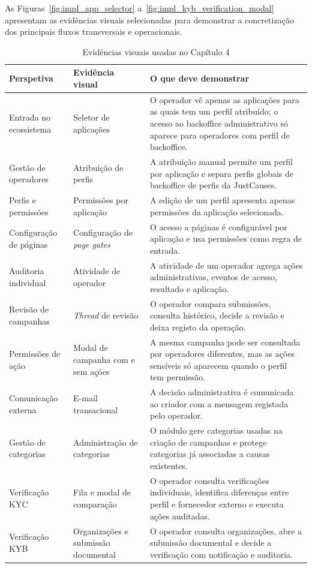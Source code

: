 As Figuras~\ref{fig:impl_app_selector} a~\ref{fig:impl_kyb_verification_modal} apresentam as evidências visuais selecionadas para demonstrar a concretização dos principais fluxos transversais e operacionais.

\begin{table}[H]
\caption{Evidências visuais usadas no Capítulo 4}
\label{tab:evidencias_prints}
\begin{center}
\begingroup
\scriptsize
\setlength{\tabcolsep}{4pt}
\begin{tabular}{|p{2.9cm}|p{3.8cm}|p{5.9cm}|}
\hline
\textbf{Perspetiva} & \textbf{Evidência visual} & \textbf{O que deve demonstrar} \\ \hline
Entrada no ecossistema & Seletor de aplicações & O operador vê apenas as aplicações para as quais tem um perfil atribuído; o acesso ao backoffice administrativo só aparece para operadores com perfil de backoffice. \\ \hline
Gestão de operadores & Atribuição de perfis & A atribuição manual permite um perfil por aplicação e separa perfis globais de backoffice de perfis da JustCauses. \\ \hline
Perfis e permissões & Permissões por aplicação & A edição de um perfil apresenta apenas permissões da aplicação selecionada. \\ \hline
Configuração de páginas & Configuração de \textit{page gates} & O acesso a páginas é configurável por aplicação e usa permissões como regra de entrada. \\ \hline
Auditoria individual & Atividade de operador & A atividade de um operador agrega ações administrativas, eventos de acesso, resultado e aplicação. \\ \hline
Revisão de campanhas & \textit{Thread} de revisão & O operador compara submissões, consulta histórico, decide a revisão e deixa registo da operação. \\ \hline
Permissões de ação & Modal de campanha com e sem ações & A mesma campanha pode ser consultada por operadores diferentes, mas as ações sensíveis só aparecem quando o perfil tem permissão. \\ \hline
Comunicação externa & E-mail transacional & A decisão administrativa é comunicada ao criador com a mensagem registada pelo operador. \\ \hline
Gestão de categorias & Administração de categorias & O módulo gere categorias usadas na criação de campanhas e protege categorias já associadas a causas existentes. \\ \hline
Verificação KYC & Fila e modal de comparação & O operador consulta verificações individuais, identifica diferenças entre perfil e fornecedor externo e executa ações auditadas. \\ \hline
Verificação KYB & Organizações e submissão documental & O operador consulta organizações, abre a submissão documental e decide a verificação com notificação e auditoria. \\ \hline
\end{tabular}
\endgroup
\end{center}
\end{table}

